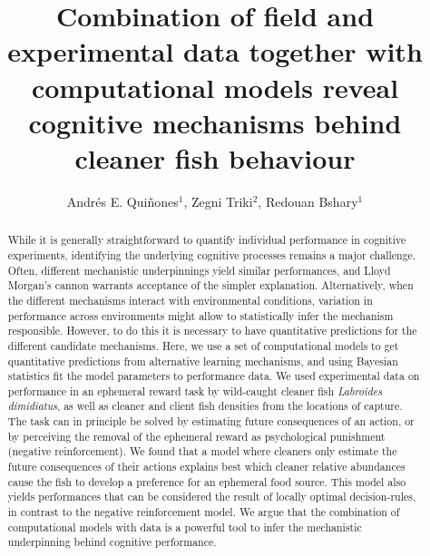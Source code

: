 \documentclass[]{rsos}%
\begin{document}
\title{Combination of field and experimental data together with computational models reveal cognitive mechanisms behind cleaner fish behaviour}

\author{
Andrés E. Quiñones$^{1}$,
Zegni Triki$^{2}$,
Redouan Bshary$^{1}$}

\address{
  $^{1}$Institute of Biology, University of Neuchâtel, Neuchâtel, Switzerland\\
  $^{2}$Department of Zoology, Stockholm University, Stockholm, Sweden}
\subject{
Behavioural ecology,
Cognitive ecology,
Animal behaviour}



\begin{abstract}
While it is generally straightforward to quantify individual performance in cognitive experiments, identifying the underlying cognitive processes remains a major challenge. Often, different mechanistic underpinnings yield similar performances, and Lloyd Morgan's cannon warrants acceptance of the simpler explanation. Alternatively, when the different mechanisms interact with environmental conditions, variation in performance across environments might allow to statistically infer the mechanism responsible. However, to do this it is necessary to have quantitative predictions for the different candidate mechanisms. Here, we use a set of computational models to get quantitative predictions from alternative learning mechanisms, and using Bayesian statistics fit the model parameters to performance data. We used experimental data on performance in an ephemeral reward task by wild-caught cleaner fish \emph{Labroides dimidiatus}, as well as cleaner and client fish densities from the locations of capture. The task can in principle be solved by estimating future consequences of an action, or by perceiving the removal of the ephemeral reward as psychological punishment (negative reinforcement). We found that a model where cleaners only estimate the future consequences of their actions explains best which cleaner relative abundances cause the fish to develop a preference for an ephemeral food source. This model also yields performances that can be considered the result of locally optimal decision-rules, in contrast to the negative reinforcement model. We argue that the combination of computational models with data is a powerful tool to infer the mechanistic underpinning behind cognitive performance.
\end{abstract}
\end{document}
